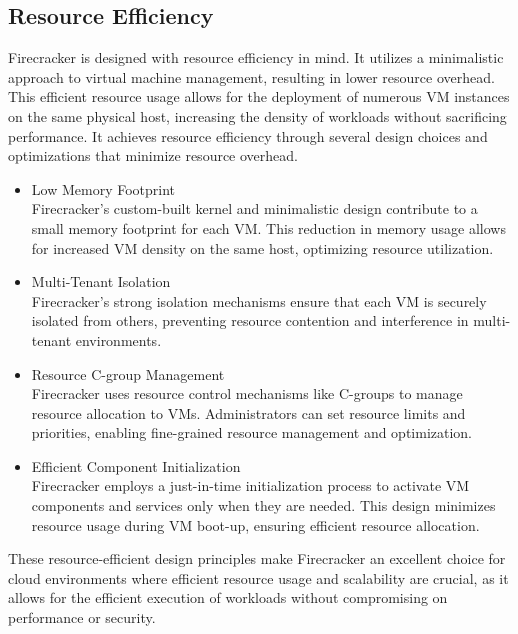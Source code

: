 \documentclass[conference]{IEEEtran}
\begin{document}
\subsection{Resource Efficiency}
Firecracker is designed with resource efficiency in mind. It utilizes a minimalistic approach to virtual machine management, resulting in lower resource overhead. This efficient resource usage allows for the deployment of numerous VM instances on the same physical host, increasing the density of workloads without sacrificing performance. It achieves resource efficiency through several design choices and optimizations that minimize resource overhead.
\begin{itemize}
	\item Low Memory Footprint\\
		Firecracker's custom-built kernel and minimalistic design contribute to a small memory footprint for each VM. This reduction in memory usage allows for increased VM density on the same host, optimizing resource utilization.
	\item Multi-Tenant Isolation\\
		Firecracker's strong isolation mechanisms ensure that each VM is securely isolated from others, preventing resource contention and interference in multi-tenant environments.
	\item Resource C-group Management\\
		Firecracker uses resource control mechanisms like C-groups to manage resource allocation to VMs. Administrators can set resource limits and priorities, enabling fine-grained resource management and optimization.
	\item Efficient Component Initialization\\
		Firecracker employs a just-in-time initialization process to activate VM components and services only when they are needed. This design minimizes resource usage during VM boot-up, ensuring efficient resource allocation.
\end{itemize}
These resource-efficient design principles make Firecracker an excellent choice for cloud environments where efficient resource usage and scalability are crucial, as it allows for the efficient execution of workloads without compromising on performance or security.
\end{document}
